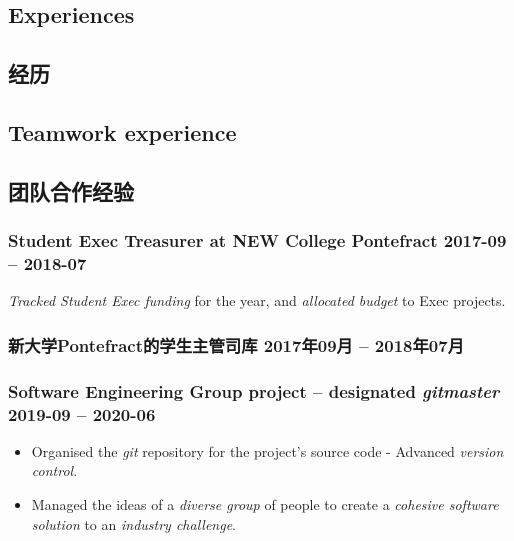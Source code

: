 \begin{xen}
\section{Experiences}
\end{xen}
\begin{xcn}
\section{经历}
\end{xcn}
\begin{xen}
    \subsection{Teamwork experience}
\end{xen}
\begin{xcn}
    \subsection{团队合作经验}
\end{xcn}
\begin{xen}
        \subsubsection{Student Exec Treasurer at NEW College Pontefract
        \hfill 2017-09 -- 2018-07}
                \emph{Tracked Student Exec funding} for the year, and
                \emph{allocated budget} to Exec projects.
\end{xen}
\begin{xcn}
        \subsubsection{新大学Pontefract的学生主管司库 %
        \hfill 2017年09月 -- 2018年07月}
\end{xcn}
\begin{xen}
        \subsubsection{Software Engineering Group project -- designated \emph{gitmaster}
        \hfill 2019-09 -- 2020-06}
            \begin{itemize}
                \item Organised the \emph{git} repository for the project's
                    source code - Advanced \emph{version control}.
                \item Managed the ideas of a \emph{diverse group} of people to
                    create a \emph{cohesive software solution} to an
                    \emph{industry challenge}.
            \end{itemize}
\end{xen}
